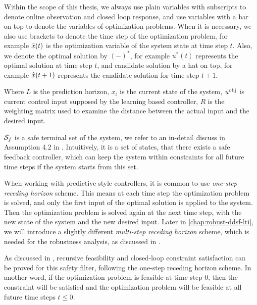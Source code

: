 Within the scope of this thesis, we always use plain variables with subscripts to denote online observation and closed loop response, and use variables with a bar on top to denote the variables of optimization problems.
When it is necessary, we also use brackets to denote the time step of the optimization problem, for example $\bar{x}(t)$ is the optimization variable of the system state at time step $t$.
Also, we denote the optimal solution by $(-)^*$, for example $u^*(t)$ represents the optimal solution at time step $t$, and candidate solution by a hat on top, for example $\hat{x}(t+1)$ represents the candidate solution for time step $t+1$.

Where $L$ is the prediction horizon, $x_t$ is the current state of the system, $u^{\text{obj}}$ is current control input supposed by the learning based controller, $R$ is the weighting matrix used to examine the distance between the actual input and the desired input.

$\mathcal{S}_f$ is a safe terminal set of the system, we refer to an in-detail discuss in Assumption 4.2 in \cite{wabersich_predictive_sf_2021}.
Intuitively, it is a set of states, that there exists a safe feedback controller, which can keep the system within constraints for all future time steps if the system starts from this set.

When working with predictive style controllers, it is common to use \emph{one-step receding horizon} scheme.
This means at each time step the optimization problem is solved, and only the first input of the optimal solution is applied to the system.
Then the optimization problem is solved again at the next time step, with the new state of the system and the new desired input.
Later in \cref{chap:robust-ddsf-lti}, we will introduce a slightly different \emph{multi-step receding horizon} scheme, which is needed for the robustness analysis, as discussed in \cite{berberich_data-driven-robust_2021}.

As discussed in \cite{wabersich_predictive_sf_2021}, recursive feasibility and closed-loop constraint satisfaction can be proved for this safety filter, following the one-step receding horizon scheme.
In another word, if the optimization problem is feasible at time step $0$, then the constraint will be satisfied and the optimization problem will be feasible at all future time steps $t \leq 0$.
